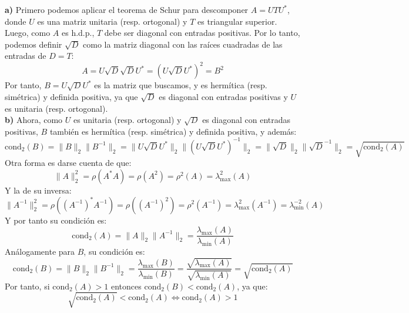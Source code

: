 {
    \textbf{a)} Primero podemos aplicar el teorema de Schur para descomponer $A=UTU^*$, donde $U$ es una matriz unitaria (resp. ortogonal) y $T$ es triangular superior. Luego, como $A$ es h.d.p., $T$ debe ser diagonal con entradas positivas. Por lo tanto, podemos definir $\sqrt{D}$ como la matriz diagonal con las raíces cuadradas de las entradas de $D=T$:
    \[
        A=U\sqrt{D}\sqrt{D}U^*=(U\sqrt{D}U^*)^2 = B^2
    \]
    Por tanto, $B=U\sqrt{D}U^*$ es la matriz que buscamos, y es hermítica (resp. simétrica) y definida positiva, ya que $\sqrt{D}$ es diagonal con entradas positivas y $U$ es unitaria (resp. ortogonal).\\
    \textbf{b)} Ahora, como $U$ es unitaria (resp. ortogonal) y $\sqrt{D}$ es diagonal con entradas positivas, $B$ también es hermítica (resp. simétrica) y definida positiva, y además:
    \[
        \text{cond}_2(B) = 
        \| B\|_2 \| B^{-1} \|_2 = 
        \| U\sqrt{D}U^* \|_2 \| (U\sqrt{D}U^*)^{-1} \|_2 = 
        \| \sqrt{D} \|_2 \| \sqrt{D}^{-1} \|_2 = 
        \sqrt{\text{cond}_2(A)}
    \]
    Otra forma es darse cuenta de que:
    \[
        \| A \|_2^2 = \rho(A^*A) = \rho(A^2) = \rho^2(A) = \lambda_{\max}^2(A)
    \]
    Y la de su inversa:
    \[
        \| A^{-1} \|_2^2 = 
        \rho((A^{-1})^*A^{-1}) = 
        \rho((A^{-1})^2) = 
        \rho^2(A^{-1}) = 
        \lambda_{\max}^2(A^{-1}) =
        \lambda_{\min}^{-2}(A)
    \]
    Y por tanto su condición es: 
    \[
        \text{cond}_2(A) =
        \| A \|_2 \| A^{-1} \|_2 =
        \frac{\lambda_{\max}(A)}{\lambda_{\min}(A)}
    \]
    Análogamente para $B$, su condición es:
    \[
        \text{cond}_2(B) =
        \| B \|_2 \| B^{-1} \|_2 =
        \frac{\lambda_{\max}(B)}{\lambda_{\min}(B)} =
        \frac{\sqrt{\lambda_{\max}(A)}}{\sqrt{\lambda_{\min}(A)}} =
        \sqrt{\text{cond}_2(A)}
    \] 
    Por tanto, si $\text{cond}_2(A) > 1$ entonces $\text{cond}_2(B) < \text{cond}_2(A)$, ya que:
    \[
        \sqrt{\text{cond}_2(A)} < \text{cond}_2(A) \iff
        \text{cond}_2(A) > 1
    \]
}